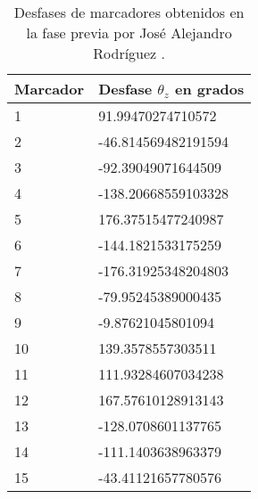 \begin{table}[H]
	\centering
	\begin{tabular}{|l|l|}
		\hline
		\textbf{Marcador} & \textbf{Desfase $\theta _{z}$ en grados} \\ \hline
		1                 & 91.99470274710572                      \\ \hline
		2                 & -46.814569482191594                    \\ \hline
		3                 & -92.39049071644509                     \\ \hline
		4                 & -138.20668559103328                    \\ \hline
		5                 & 176.37515477240987                     \\ \hline
		6                 & -144.1821533175259                     \\ \hline
		7                 & -176.31925348204803                    \\ \hline
		8                 & -79.95245389000435                     \\ \hline
		9                 & -9.87621045801094                      \\ \hline
		10                & 139.3578557303511                      \\ \hline
		11                & 111.93284607034238                     \\ \hline
		12                & 167.57610128913143                     \\ \hline
		13                & -128.0708601137765                     \\ \hline
		14                & -111.1403638963379                     \\ \hline
		15                & -43.41121657780576                     \\ \hline
	\end{tabular}
	\caption{Desfases de marcadores obtenidos en la fase previa por José Alejandro Rodríguez \cite{RodriguezJA_2023_tesis}.}
	\label{cuadro:desfases_anteriores}
\end{table}

